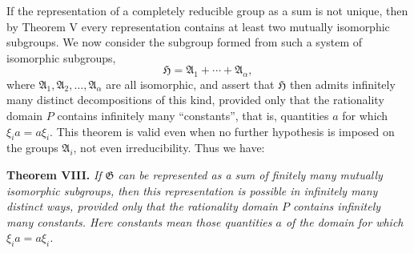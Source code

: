 \documentclass[11pt]{article}
\begin{document}
If the representation of a completely reducible group as a sum is not unique, then by Theorem V every representation contains at least two mutually isomorphic subgroups. We now consider the subgroup formed from such a system of isomorphic subgroups,
\[
  \mathfrak H=\mathfrak A_1+\cdots+\mathfrak A_\alpha,
\]
where $\mathfrak A_1,\mathfrak A_2,
\ldots,
\mathfrak A_\alpha$ are all isomorphic, and assert that $\mathfrak H$ then admits infinitely many distinct decompositions of this kind, provided only that the rationality domain $P$ contains infinitely many ``constants'', that is, quantities $a$ for which $\xi_i a=a\xi_i$. This theorem is valid even when no further hypothesis is imposed on the groups $\mathfrak A_i$, not even irreducibility. Thus we have:

\textbf{Theorem VIII.} \emph{If $\mathfrak G$ can be represented as a sum of finitely many mutually isomorphic subgroups, then this representation is possible in infinitely many distinct ways, provided only that the rationality domain $P$ contains infinitely many constants. Here constants mean those quantities $a$ of the domain for which $\xi_i a=a\xi_i$.}
\end{document}
